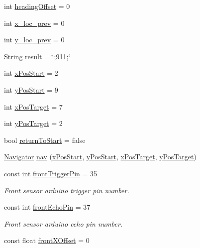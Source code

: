 \begin{DoxyCompactItemize}
\item 
int \mbox{\hyperlink{bot_main_8ino_a868b73d778ddc36f8b77659dbc4aaa3c}{heading\+Offset}} = 0
\item 
int \mbox{\hyperlink{bot_main_8ino_ac5e6eb62b1453be293f043e996637130}{x\+\_\+loc\+\_\+prev}} = 0
\item 
int \mbox{\hyperlink{bot_main_8ino_a6cd6110c1f427db4b1b4b5a5b03b5242}{y\+\_\+loc\+\_\+prev}} = 0
\item 
String \mbox{\hyperlink{bot_main_8ino_ade3e4dd136fe976f4d00476ead564457}{result}} = \char`\"{};911;\char`\"{}
\item 
int \mbox{\hyperlink{bot_main_8ino_ad7faed3f920e2a86bd4d0462a8d907ea}{x\+Pos\+Start}} = 2
\item 
int \mbox{\hyperlink{bot_main_8ino_a22fa20776245d8cff73524333913a417}{y\+Pos\+Start}} = 9
\item 
int \mbox{\hyperlink{bot_main_8ino_a9ff06ce163dbdadcbad347cd3f4fd6b1}{x\+Pos\+Target}} = 7
\item 
int \mbox{\hyperlink{bot_main_8ino_a4c0ad4a6d9cc090aaf844632d913b377}{y\+Pos\+Target}} = 2
\item 
bool \mbox{\hyperlink{bot_main_8ino_a2d7b030f0912b0b67f4595263a878078}{return\+To\+Start}} = false
\item 
\mbox{\hyperlink{class_navigator}{Navigator}} \mbox{\hyperlink{bot_main_8ino_aa40b8d55e3cb08134da6fa492346bcd2}{nav}} (\mbox{\hyperlink{bot_main_8ino_ad7faed3f920e2a86bd4d0462a8d907ea}{x\+Pos\+Start}}, \mbox{\hyperlink{bot_main_8ino_a22fa20776245d8cff73524333913a417}{y\+Pos\+Start}}, \mbox{\hyperlink{bot_main_8ino_a9ff06ce163dbdadcbad347cd3f4fd6b1}{x\+Pos\+Target}}, \mbox{\hyperlink{bot_main_8ino_a4c0ad4a6d9cc090aaf844632d913b377}{y\+Pos\+Target}})
\item 
const int \mbox{\hyperlink{bot_main_8ino_ae091a21fa97656ee7bd8c5f79c45b752}{front\+Trigger\+Pin}} = 35
\begin{DoxyCompactList}\small\item\em Front sensor arduino trigger pin number. \end{DoxyCompactList}\item 
const int \mbox{\hyperlink{bot_main_8ino_a0b14c45d0e2dfeef70f98b914ca277f5}{front\+Echo\+Pin}} = 37
\begin{DoxyCompactList}\small\item\em Front sensor arduino echo pin number. \end{DoxyCompactList}\item 
const float \mbox{\hyperlink{bot_main_8ino_abdd898a2dfa2f64e2821af36c6ed3724}{front\+X\+Offset}} = 0

\end{DoxyCompactItemize}
